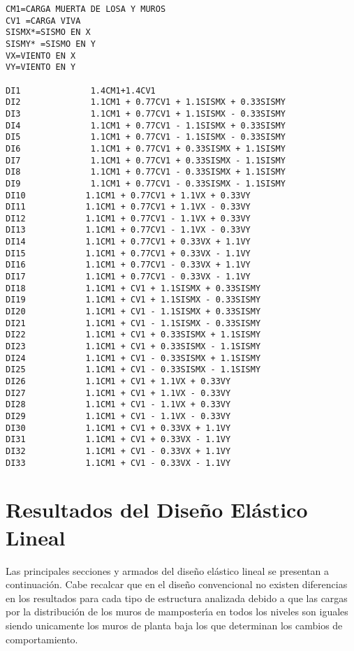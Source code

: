 \begin{verbatim}
CM1=CARGA MUERTA DE LOSA Y MUROS
CV1 =CARGA VIVA
SISMX*=SISMO EN X
SISMY* =SISMO EN Y
VX=VIENTO EN X
VY=VIENTO EN Y

DI1              1.4CM1+1.4CV1   
DI2              1.1CM1 + 0.77CV1 + 1.1SISMX + 0.33SISMY   
DI3              1.1CM1 + 0.77CV1 + 1.1SISMX - 0.33SISMY   
DI4              1.1CM1 + 0.77CV1 - 1.1SISMX + 0.33SISMY  
DI5              1.1CM1 + 0.77CV1 - 1.1SISMX - 0.33SISMY   
DI6              1.1CM1 + 0.77CV1 + 0.33SISMX + 1.1SISMY   
DI7              1.1CM1 + 0.77CV1 + 0.33SISMX - 1.1SISMY   
DI8              1.1CM1 + 0.77CV1 - 0.33SISMX + 1.1SISMY   
DI9              1.1CM1 + 0.77CV1 - 0.33SISMX - 1.1SISMY   
DI10            1.1CM1 + 0.77CV1 + 1.1VX + 0.33VY   
DI11            1.1CM1 + 0.77CV1 + 1.1VX - 0.33VY  
DI12            1.1CM1 + 0.77CV1 - 1.1VX + 0.33VY   
DI13            1.1CM1 + 0.77CV1 - 1.1VX - 0.33VY   
DI14            1.1CM1 + 0.77CV1 + 0.33VX + 1.1VY   
DI15            1.1CM1 + 0.77CV1 + 0.33VX - 1.1VY   
DI16            1.1CM1 + 0.77CV1 - 0.33VX + 1.1VY   
DI17            1.1CM1 + 0.77CV1 - 0.33VX - 1.1VY   
DI18            1.1CM1 + CV1 + 1.1SISMX + 0.33SISMY   
DI19            1.1CM1 + CV1 + 1.1SISMX - 0.33SISMY   
DI20            1.1CM1 + CV1 - 1.1SISMX + 0.33SISMY   
DI21            1.1CM1 + CV1 - 1.1SISMX - 0.33SISMY   
DI22            1.1CM1 + CV1 + 0.33SISMX + 1.1SISMY   
DI23            1.1CM1 + CV1 + 0.33SISMX - 1.1SISMY   
DI24            1.1CM1 + CV1 - 0.33SISMX + 1.1SISMY   
DI25            1.1CM1 + CV1 - 0.33SISMX - 1.1SISMY   
DI26            1.1CM1 + CV1 + 1.1VX + 0.33VY   
DI27            1.1CM1 + CV1 + 1.1VX - 0.33VY   
DI28            1.1CM1 + CV1 - 1.1VX + 0.33VY   
DI29            1.1CM1 + CV1 - 1.1VX - 0.33VY   
DI30            1.1CM1 + CV1 + 0.33VX + 1.1VY   
DI31            1.1CM1 + CV1 + 0.33VX - 1.1VY   
DI32            1.1CM1 + CV1 - 0.33VX + 1.1VY   
DI33            1.1CM1 + CV1 - 0.33VX - 1.1VY   

\end{verbatim}

\newpage

\section{Resultados del Dise\~no El\'astico Lineal}

Las principales secciones y armados del dise\~no el\'astico lineal se presentan a continuaci\'on. Cabe recalcar que en el dise\~no convencional no existen diferencias en los resultados para cada tipo de estructura analizada debido a que las cargas por la distribuci\'on de los muros de mamposter\'{\i}a en todos los niveles son iguales siendo unicamente los muros de planta baja los que determinan los cambios de comportamiento.

